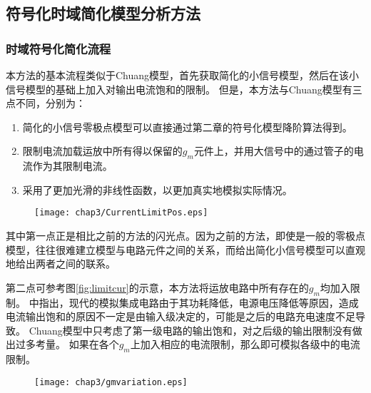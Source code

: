 \subsection{符号化时域简化模型分析方法}

\subsubsection{时域符号化简化流程}

本方法的基本流程类似于Chuang模型，首先获取简化的小信号模型，然后在该小信号模型的基础上加入对输出电流饱和的限制。
但是，本方法与Chuang模型有三点不同，分别为：

\begin{enumerate}[label=\emph{\alph*})]
	\item 简化的小信号零极点模型可以直接通过第二章的符号化模型降阶算法得到。
	\item 限制电流加载运放中所有得以保留的$g_m$元件上，并用大信号中的通过管子的电流作为其限制电流。
	\item 采用了更加光滑的非线性函数，以更加真实地模拟实际情况。
\end{enumerate}

\begin{figure}[!htp]
	\centering
	\texttt{[image: chap3/CurrentLimitPos.eps]}
\end{figure}

其中第一点正是相比之前的方法的闪光点。因为之前的方法，即使是一般的零极点模型，往往很难建立模型与电路元件之间的关系，而给出简化小信号模型可以直观地给出两者之间的联系。

第二点可参考图\ref{fig:limitcur}的示意，本方法将运放电路中所有存在的$g_m$均加入限制。
\parencite{Yavari-TSSlew-2005}中指出，现代的模拟集成电路由于其功耗降低，电源电压降低等原因，造成电流输出饱和的原因不一定是由输入级决定的，可能是之后的电路充电速度不足导致。
Chuang模型中只考虑了第一级电路的输出饱和，对之后级的输出限制没有做出过多考量。
如果在各个$g_m$上加入相应的电流限制，那么即可模拟各级中的电流限制。

\begin{figure}[!htp]
	\centering
	\texttt{[image: chap3/gmvariation.eps]}
\end{figure}

